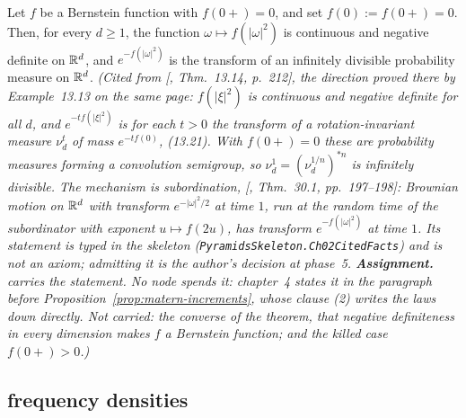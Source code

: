 \begin{theorem}
\label{thm:cited-A57}
\notready
Let $f$ be a Bernstein function with $f(0{+}) = 0$, and set $f(0) := f(0{+}) = 0$. Then, for
every $d \ge 1$, the function
$\omega \mapsto f(|\omega|^2)$ is continuous and negative definite on $\mathbb{R}^d$, and
$e^{-f(|\omega|^2)}$ is the transform of an infinitely divisible probability measure on $\mathbb{R}^d$.
\statusA\quad{}\quad\emph{(Cited from [, Thm.~13.14, p.~212],
the direction proved there by Example~13.13 on the same page: $f(|\xi|^2)$ is continuous and
negative definite for all $d$, and $e^{-tf(|\xi|^2)}$ is for each $t > 0$ the transform of a
rotation-invariant measure $\nu^t_d$ of mass $e^{-tf(0)}$, (13.21). With $f(0{+}) = 0$ these are
probability measures forming a convolution semigroup, so $\nu^1_d = (\nu^{1/n}_d)^{*n}$ is
infinitely divisible. The mechanism is subordination, [, Thm.~30.1,
pp.~197--198]: Brownian motion on $\mathbb{R}^d$ with transform $e^{-|\omega|^2/2}$ at time $1$, run at the
random time of the subordinator with exponent $u \mapsto f(2u)$, has transform $e^{-f(|\omega|^2)}$
at time $1$. Its statement is typed in the skeleton (\texttt{PyramidsSkeleton.Ch02CitedFacts}) and is not an axiom; admitting it is the author's decision at phase~5. \textbf{Assignment.}
 carries the statement. No node spends it: chapter~4 states it in the paragraph before
Proposition~\ref{prop:matern-increments}, whose clause (2) writes the laws down directly. Not
carried: the converse of the theorem, that negative definiteness in every dimension makes $f$ a
Bernstein function; and the killed case $f(0{+}) > 0$.)}
\end{theorem}

\subsection{\Polya{} frequency densities}
\label{subsec:cited-karlin}

